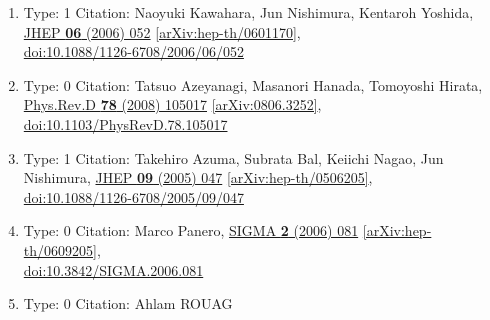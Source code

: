 \documentclass[a4paper,10pt]{article}
\begin{document}
\begin{enumerate}
\begin{enumerate}
  \item Type: 1 Citation: Naoyuki Kawahara, Jun Nishimura, Kentaroh Yoshida, \href{https://www.doi.org/10.1088/1126-6708/2006/06/052}{JHEP {\bf 06} (2006) 052}  \href{https://arxiv.org/abs/hep-th/0601170}{[arXiv:hep-th/0601170]},\\\href{https://www.doi.org/10.1088/1126-6708/2006/06/052}{doi:10.1088/1126-6708/2006/06/052}
  \item Type: 0 Citation: Tatsuo Azeyanagi, Masanori Hanada, Tomoyoshi Hirata, \href{https://www.doi.org/10.1103/PhysRevD.78.105017}{Phys.Rev.D {\bf 78} (2008) 105017}  \href{https://arxiv.org/abs/0806.3252}{[arXiv:0806.3252]},\\\href{https://www.doi.org/10.1103/PhysRevD.78.105017}{doi:10.1103/PhysRevD.78.105017}
  \item Type: 1 Citation: Takehiro Azuma, Subrata Bal, Keiichi Nagao, Jun Nishimura, \href{https://www.doi.org/10.1088/1126-6708/2005/09/047}{JHEP {\bf 09} (2005) 047}  \href{https://arxiv.org/abs/hep-th/0506205}{[arXiv:hep-th/0506205]},\\\href{https://www.doi.org/10.1088/1126-6708/2005/09/047}{doi:10.1088/1126-6708/2005/09/047}
  \item Type: 0 Citation: Marco Panero, \href{https://www.doi.org/10.3842/SIGMA.2006.081}{SIGMA {\bf 2} (2006) 081}  \href{https://arxiv.org/abs/hep-th/0609205}{[arXiv:hep-th/0609205]},\\\href{https://www.doi.org/10.3842/SIGMA.2006.081}{doi:10.3842/SIGMA.2006.081}
  \item Type: 0 Citation: Ahlam ROUAG

\end{enumerate}
\end{enumerate}
\end{document}
